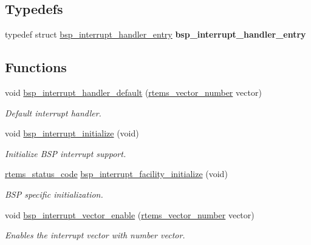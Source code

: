 \subsection*{Typedefs}
\begin{DoxyCompactItemize}
\item 
\mbox{\label{irq-generic_8h_a6610be7d6b380187c1e61f3b5fe3428d}} 
typedef struct \mbox{\hyperlink{structbsp__interrupt__handler__entry}{bsp\+\_\+interrupt\+\_\+handler\+\_\+entry}} {\bfseries bsp\+\_\+interrupt\+\_\+handler\+\_\+entry}
\end{DoxyCompactItemize}
\subsection*{Functions}
\begin{DoxyCompactItemize}
\item 
void \mbox{\hyperlink{group__bsp__interrupt_ga3f1754ddeb359b41b89f90ad7fd81d58}{bsp\+\_\+interrupt\+\_\+handler\+\_\+default}} (\mbox{\hyperlink{group__ClassicINTR_ga3e434c197d99f128e78cae4d9358bd8b}{rtems\+\_\+vector\+\_\+number}} vector)
\begin{DoxyCompactList}\small\item\em Default interrupt handler. \end{DoxyCompactList}\item 
void \mbox{\hyperlink{group__bsp__interrupt_gafccb8719531b51a8cf0163febeb42b29}{bsp\+\_\+interrupt\+\_\+initialize}} (void)
\begin{DoxyCompactList}\small\item\em Initialize B\+SP interrupt support. \end{DoxyCompactList}\item 
\mbox{\hyperlink{group__ClassicStatus_ga545d41846817eaba6143d52ee4d9e9fe}{rtems\+\_\+status\+\_\+code}} \mbox{\hyperlink{group__bsp__interrupt_gab114a6e92b17b99bf52cf24d1125a9df}{bsp\+\_\+interrupt\+\_\+facility\+\_\+initialize}} (void)
\begin{DoxyCompactList}\small\item\em B\+SP specific initialization. \end{DoxyCompactList}\item 
void \mbox{\hyperlink{group__bsp__interrupt_ga9968f1703b04b05f4f7e9fc5220da39a}{bsp\+\_\+interrupt\+\_\+vector\+\_\+enable}} (\mbox{\hyperlink{group__ClassicINTR_ga3e434c197d99f128e78cae4d9358bd8b}{rtems\+\_\+vector\+\_\+number}} vector)
\begin{DoxyCompactList}\small\item\em Enables the interrupt vector with number {\itshape vector}. \end{DoxyCompactList}\item 

\end{DoxyCompactItemize}
